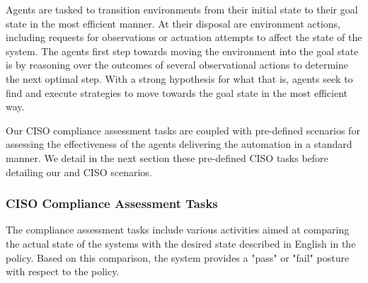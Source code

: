 Agents are tasked to transition environments from their initial state to their goal state in the most efficient manner. At their disposal are environment actions, including requests for observations or actuation attempts to affect the state of the system. The agents first step towards moving the environment into the goal state is by reasoning over the outcomes of several observational actions to determine the next optimal step. With a strong hypothesis for what that is, agents seek to find and execute strategies to move towards the goal state in the most efficient way. 

Our CISO compliance assessment tasks are coupled with pre-defined scenarios for assessing the effectiveness of the agents delivering the automation in a standard manner. We detail in the next section these pre-defined CISO tasks before detailing our \bench and CISO scenarios. 

\subsubsection{CISO Compliance Assessment Tasks}

The compliance assessment tasks include various activities aimed at comparing the actual state of the systems with the desired state described in English in the policy. Based on this comparison, the system provides a "pass" or "fail" posture with respect to the policy.



